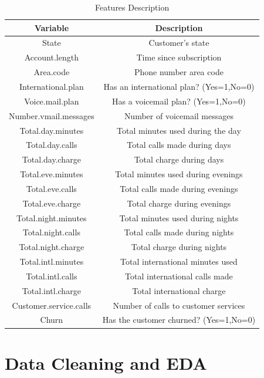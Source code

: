\documentclass[12pt,letterpaper]{article}
\begin{document}
	\begin{table}[!htb]
		\centering
		\caption{Features Description}
		\label{features}
		\begin{tabular}{|c|c|} \hline
			\textbf{Variable} & \textbf{Description}\\  \hline 
			 State  &  Customer's state \\ \hline
			 Account.length& Time since subscription \\ \hline
			 Area.code   & Phone number area code\\ \hline 
			 International.plan& Has an international plan? (Yes=1,No=0)\\ \hline 
			 Voice.mail.plan    & Has a voicemail plan? (Yes=1,No=0)\\ \hline
			 Number.vmail.messages& Number of voicemail messages\\ \hline
			 Total.day.minutes& Total minutes used during the day\\ \hline
			 Total.day.calls& Total calls made during days\\ \hline
			 Total.day.charge& Total charge during days\\ \hline
			 Total.eve.minutes& Total minutes used during evenings\\ \hline
			 Total.eve.calls& Total calls made during evenings\\ \hline
			 Total.eve.charge& Total charge during evenings\\ \hline 
			 Total.night.minutes & Total minutes used during nights\\ \hline 
			 Total.night.calls& Total calls made during nights\\ \hline
			 Total.night.charge& Total charge during nights\\ \hline 
			 Total.intl.minutes& Total international minutes used\\ \hline 
			 Total.intl.calls& Total international calls made\\ \hline 
			 Total.intl.charge& Total international charge\\\hline 
			 Customer.service.calls& Number of calls to customer services\\ \hline 
			 Churn & Has the customer churned? (Yes=1,No=0)\\ \hline
		\end{tabular}
	\end{table}
	
	\section{Data Cleaning and EDA}
	
\end{document}
